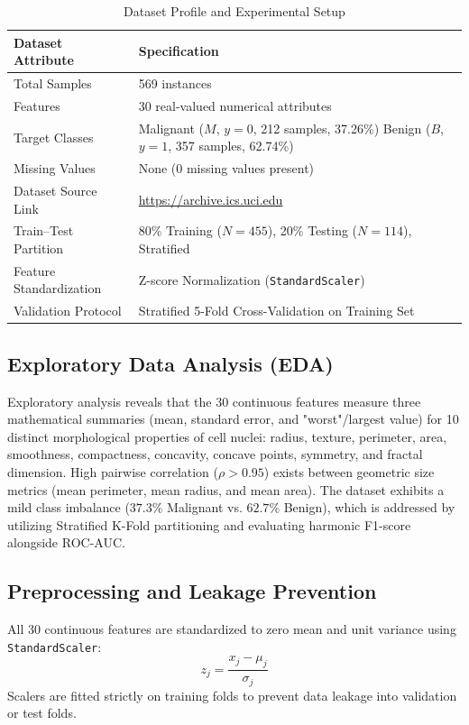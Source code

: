 \documentclass[12pt,a4paper]{article}
\begin{document}
\begin{table}[H]
\centering
\caption{Dataset Profile and Experimental Setup}
\label{tab:dataset_specs}
\begin{tabular}{|p{6cm}|p{9cm}|}
\hline
\textbf{Dataset Attribute} & \textbf{Specification} \\ \hline
Total Samples & 569 instances \\ \hline
Features & 30 real-valued numerical attributes \\ \hline
Target Classes & Malignant ($M$, $y=0$, 212 samples, 37.26\%) \newline Benign ($B$, $y=1$, 357 samples, 62.74\%) \\ \hline
Missing Values & None (0 missing values present) \\ \hline
Dataset Source Link & \url{https://archive.ics.uci.edu} \\ \hline
Train--Test Partition & 80\% Training ($N=455$), 20\% Testing ($N=114$), Stratified \\ \hline
Feature Standardization & Z-score Normalization (\texttt{StandardScaler}) \\ \hline
Validation Protocol & Stratified 5-Fold Cross-Validation on Training Set \\ \hline
\end{tabular}
\end{table}

\subsection{Exploratory Data Analysis (EDA)}
Exploratory analysis reveals that the 30 continuous features measure three mathematical summaries (mean, standard error, and "worst"/largest value) for 10 distinct morphological properties of cell nuclei: radius, texture, perimeter, area, smoothness, compactness, concavity, concave points, symmetry, and fractal dimension. 
High pairwise correlation ($\rho > 0.95$) exists between geometric size metrics (mean perimeter, mean radius, and mean area). The dataset exhibits a mild class imbalance ($37.3\%$ Malignant vs. $62.7\%$ Benign), which is addressed by utilizing Stratified K-Fold partitioning and evaluating harmonic F1-score alongside ROC-AUC.

\subsection{Preprocessing and Leakage Prevention}
All 30 continuous features are standardized to zero mean and unit variance using \texttt{StandardScaler}:
\begin{equation}
z_j = \frac{x_j - \mu_j}{\sigma_j}
\end{equation}
Scalers are fitted strictly on training folds to prevent data leakage into validation or test folds.
\end{document}
